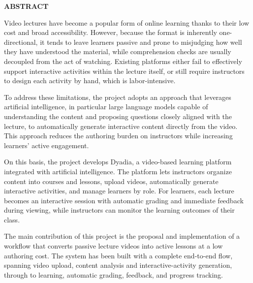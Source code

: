 \documentclass[../DoAn.tex]{subfiles}
\begin{document}
\begin{center}
    \Large{\textbf{ABSTRACT}}\\
\end{center}
\vspace{1cm}
Video lectures have become a popular form of online learning thanks to their low cost and broad accessibility. However, because the format is inherently one-directional, it tends to leave learners passive and prone to misjudging how well they have understood the material, while comprehension checks are usually decoupled from the act of watching. Existing platforms either fail to effectively support interactive activities within the lecture itself, or still require instructors to design each activity by hand, which is labor-intensive.

To address these limitations, the project adopts an approach that leverages artificial intelligence, in particular large language models capable of understanding the content and proposing questions closely aligned with the lecture, to automatically generate interactive content directly from the video. This approach reduces the authoring burden on instructors while increasing learners' active engagement.

On this basis, the project develops Dyadia, a video-based learning platform integrated with artificial intelligence. The platform lets instructors organize content into courses and lessons, upload videos, automatically generate interactive activities, and manage learners by role. For learners, each lecture becomes an interactive session with automatic grading and immediate feedback during viewing, while instructors can monitor the learning outcomes of their class.

The main contribution of this project is the proposal and implementation of a workflow that converts passive lecture videos into active lessons at a low authoring cost. The system has been built with a complete end-to-end flow, spanning video upload, content analysis and interactive-activity generation, through to learning, automatic grading, feedback, and progress tracking.
\end{document}
